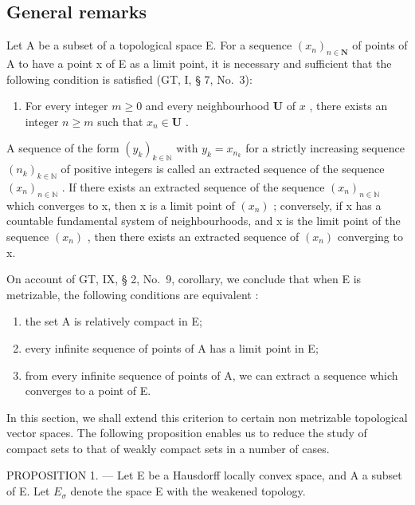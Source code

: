 \subsection{General remarks}

Let A be a subset of a topological space E. For a sequence \((x_{n})_{n\in\mathbf{N}}\) of points of A to have a point x of E as a limit point, it is necessary and sufficient that the following condition is satisfied (GT, I, § 7, No.~3):

\begin{enumerate}
\def\labelenumi{(\Alph{enumi})}
\tightlist
\item
  For every integer \(m \geqslant 0\) and every neighbourhood \(\mathbf{U}\) of \(x\) , there exists an integer \(n \geqslant m\) such that \(x_{n} \in \mathbf{U}\) .
\end{enumerate}

A sequence of the form \((y_{k})_{k\in\mathbb{N}}\) with \(y_{k}=x_{n_{k}}\) for a strictly increasing sequence \((n_{k})_{k\in\mathbb{N}}\) of positive integers is called an extracted sequence of the sequence \((x_{n})_{n\in\mathbb{N}}\) . If there exists an extracted sequence of the sequence \((x_{n})_{n\in\mathbb{N}}\) which converges to x, then x is a limit point of \((x_{n})\) ; conversely, if x has a countable fundamental system of neighbourhoods, and x is the limit point of the sequence \((x_{n})\) , then there exists an extracted sequence of \((x_{n})\) converging to x.

On account of GT, IX, § 2, No.~9, corollary, we conclude that when E is metrizable, the following conditions are equivalent :

\begin{enumerate}
\def\labelenumi{\alph{enumi})}
\item
  the set A is relatively compact in E;
\item
  every infinite sequence of points of A has a limit point in E;
\item
  from every infinite sequence of points of A, we can extract a sequence which converges to a point of E.
\end{enumerate}

In this section, we shall extend this criterion to certain non metrizable topological vector spaces. The following proposition enables us to reduce the study of compact sets to that of weakly compact sets in a number of cases.

PROPOSITION 1. --- Let E be a Hausdorff locally convex space, and A a subset of E. Let \(E_{\sigma}\) denote the space E with the weakened topology.

